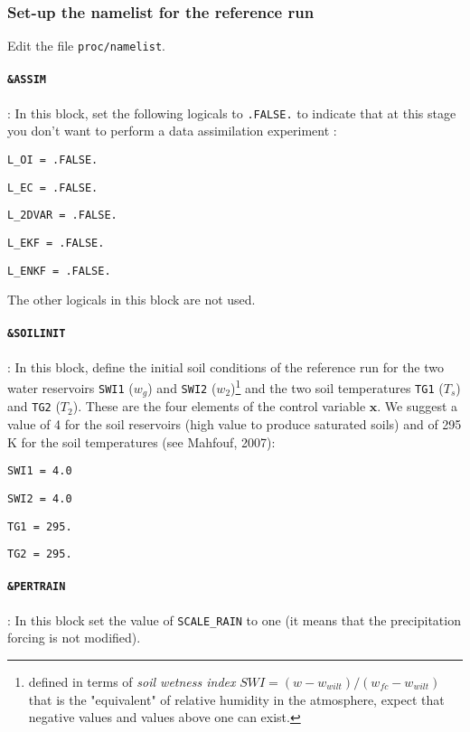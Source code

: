 \documentclass[12pt]{article}
\begin{document}
\subsubsection{Set-up the namelist for the reference run}
Edit the file {\tt proc/namelist}. 
\paragraph{\tt \&ASSIM}: In this block, set the following
logicals to  {\tt .FALSE.} to indicate that at this stage you don't want to perform
a data assimilation experiment : 
\begin{description}
\item   {\tt L\_OI = .FALSE.}
\item   {\tt L\_EC = .FALSE.}
\item   {\tt L\_2DVAR = .FALSE.}
\item   {\tt L\_EKF = .FALSE.}
\item   {\tt L\_ENKF = .FALSE.}
\end{description}
The other logicals in this block
are not used.
\paragraph{\tt \&SOILINIT}: In this block, define the initial soil conditions 
of the reference run for the two water reservoirs {\tt SWI1} ($w_g$)
and {\tt SWI2} ($w_2$)\footnote{defined in terms of {\it soil wetness index} 
$SWI=(w-w_{wilt})/(w_{fc}-w_{wilt})$ that is the "equivalent"
of relative humidity in the atmosphere, expect that negative
values and values above one can exist.} and the two
soil temperatures {\tt TG1} ($T_s$) and {\tt TG2} ($T_2$). 
These are the four elements of the
control variable $\mathbf{x}$. We suggest a value of 4 for the 
soil reservoirs (high value to produce saturated soils)
and of 295 K for the soil temperatures (see Mahfouf, 2007):
\begin{description}
 \item   {\tt SWI1 = 4.0}
 \item   {\tt SWI2 = 4.0}
 \item   {\tt TG1 = 295.}
 \item   {\tt TG2 = 295.}
\end{description}
\paragraph{\tt \&PERTRAIN} : In this block set the value of {\tt SCALE\_RAIN} to one (it means
that the precipitation forcing is not modified).
\end{document}
